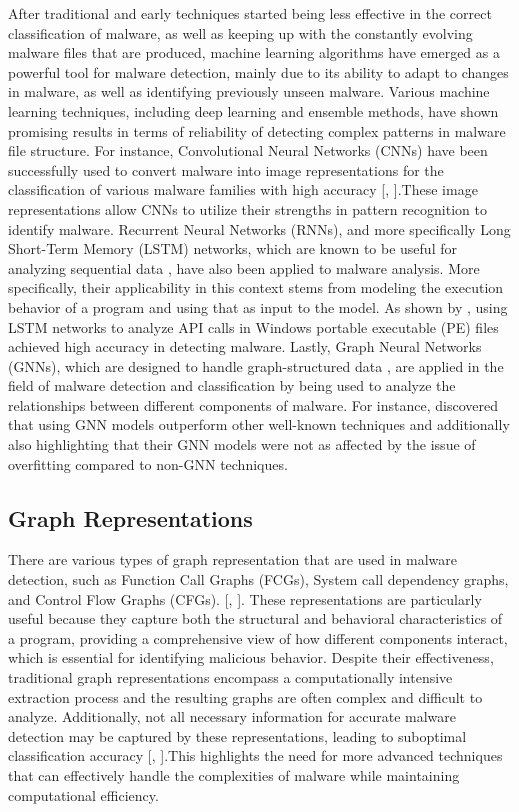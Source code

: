 \documentclass[11pt]{article}
\begin{document}
After traditional and early techniques started being less effective in the correct classification of malware, as well as keeping up with the constantly evolving malware files that are produced, machine learning algorithms have emerged as a powerful tool for malware detection, mainly due to its ability to adapt to changes in malware, as well as identifying previously unseen malware. Various machine learning techniques, including deep learning and ensemble methods, have shown promising results in terms of reliability of detecting complex patterns in malware file structure. 
For instance, Convolutional Neural Networks (CNNs) have been successfully used to convert malware into image representations for the classification of various malware families with high accuracy [\cite{sym14112304}, \cite{10830884}].These image representations allow CNNs to utilize their strengths in pattern recognition to identify malware. 
Recurrent Neural Networks (RNNs), and more specifically Long Short-Term Memory (LSTM) networks, which are known to be useful for analyzing sequential data \cite{ALSELWI2024102068}, have also been applied to malware analysis. More specifically, their applicability in this context stems from modeling the execution behavior of a program and using that as input to the model. As shown by \cite{catak2020deep}, using LSTM networks to analyze API calls in Windows portable executable (PE) files achieved high accuracy in detecting malware. 
Lastly, Graph Neural Networks (GNNs), which are designed to handle graph-structured data \cite{khemani2024review}, are applied in the field of malware detection and classification by being used to analyze the relationships between different components of malware. For instance,\cite{malhotra2023comparisongraphneuralnetworks} discovered that using GNN models outperform other well-known techniques and additionally also highlighting that their GNN models were not as affected by the issue of overfitting compared to non-GNN techniques. 

\subsection{Graph Representations}
There are various types of graph representation that are used in malware detection, such as Function Call Graphs (FCGs), System call dependency graphs, and Control Flow Graphs (CFGs). [\cite{9023948}, \cite{AMJATH2025103651}]. These representations are particularly useful because they capture both the structural and behavioral characteristics of a program, providing a comprehensive view of how different components interact, which is essential for identifying malicious behavior. Despite their effectiveness, traditional graph representations encompass a computationally intensive extraction process and the resulting graphs are often complex and difficult to analyze. Additionally, not all necessary information for accurate malware detection may be captured by these representations, leading to suboptimal classification accuracy [\cite{9023948}, \cite{10.1145/3664649}].This highlights the need for more advanced techniques that can effectively handle the complexities of malware while maintaining computational efficiency.
\end{document}
